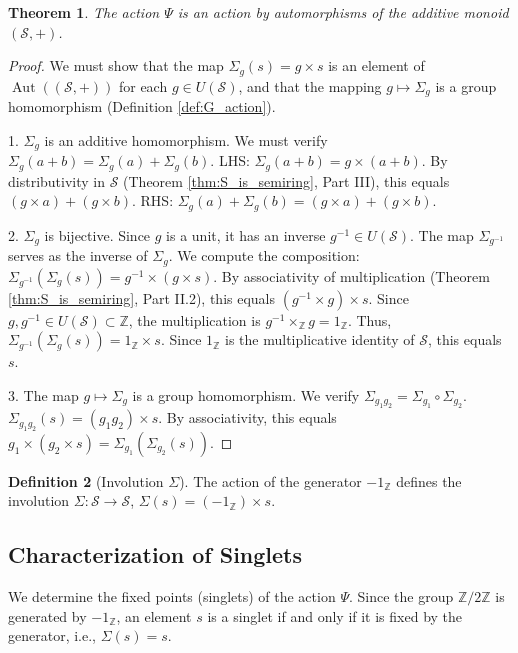 \documentclass[11pt, a4paper]{article}
\theoremstyle{plain}
\newtheorem{theorem}{Theorem}[section]
\theoremstyle{definition}
\newtheorem{definition}[theorem]{Definition}
\numberwithin{equation}{section}
\newcommand{\Z}{\mathbb{Z}}
\newcommand{\SemiringS}{\mathcal{S}}
\newcommand{\Ztwo}{\mathbb{Z}/2\mathbb{Z}}
\DeclareMathOperator{\Aut}{Aut}
\begin{document}
\begin{theorem}\label{thm:Psi_additive_automorphism}
The action $\Psi$ is an action by automorphisms of the additive monoid $(\SemiringS, +)$.
\end{theorem}
\begin{proof}
We must show that the map $\Sigma_g(s) = g \times s$ is an element of $\Aut((\SemiringS, +))$ for each $g \in U(\SemiringS)$, and that the mapping $g \mapsto \Sigma_g$ is a group homomorphism (Definition \ref{def:G_action}).

1. $\Sigma_g$ is an additive homomorphism.
We must verify $\Sigma_g(a+b) = \Sigma_g(a)+\Sigma_g(b)$.
LHS: $\Sigma_g(a+b) = g\times(a+b)$. By distributivity in $\SemiringS$ (Theorem \ref{thm:S_is_semiring}, Part III), this equals $(g\times a) + (g\times b)$.
RHS: $\Sigma_g(a)+\Sigma_g(b) = (g\times a) + (g\times b)$.

2. $\Sigma_g$ is bijective. Since $g$ is a unit, it has an inverse $g^{-1} \in U(\SemiringS)$. The map $\Sigma_{g^{-1}}$ serves as the inverse of $\Sigma_g$.
We compute the composition: $\Sigma_{g^{-1}}(\Sigma_g(s)) = g^{-1}\times(g\times s)$. By associativity of multiplication (Theorem \ref{thm:S_is_semiring}, Part II.2), this equals $(g^{-1}\times g)\times s$.
Since $g, g^{-1} \in U(\SemiringS) \subset \Z$, the multiplication is $g^{-1}\times_{\Z} g = 1_{\Z}$.
Thus, $\Sigma_{g^{-1}}(\Sigma_g(s)) = 1_{\Z}\times s$. Since $1_{\Z}$ is the multiplicative identity of $\SemiringS$, this equals $s$.

3. The map $g \mapsto \Sigma_g$ is a group homomorphism.
We verify $\Sigma_{g_1 g_2} = \Sigma_{g_1} \circ \Sigma_{g_2}$.
$\Sigma_{g_1 g_2}(s) = (g_1 g_2)\times s$. By associativity, this equals $g_1\times(g_2\times s) = \Sigma_{g_1}(\Sigma_{g_2}(s))$.
\end{proof}

\begin{definition}[Involution $\Sigma$]
The action of the generator $-1_{\Z}$ defines the involution $\Sigma: \SemiringS \to \SemiringS$, $\Sigma(s) = (-1_{\Z}) \times s$.
\end{definition}

\subsection{Characterization of Singlets}

We determine the fixed points (singlets) of the action $\Psi$. Since the group $\Ztwo$ is generated by $-1_{\Z}$, an element $s$ is a singlet if and only if it is fixed by the generator, i.e., $\Sigma(s)=s$.
\end{document}

